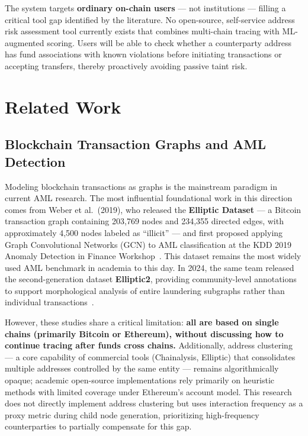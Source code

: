 \documentclass[12pt,a4paper]{article}
\begin{document}
The system targets \textbf{ordinary on-chain users} --- not institutions --- filling a critical tool gap identified by the literature. No open-source, self-service address risk assessment tool currently exists that combines multi-chain tracing with ML-augmented scoring. Users will be able to check whether a counterparty address has fund associations with known violations before initiating transactions or accepting transfers, thereby proactively avoiding passive taint risk.


\section{Related Work}

\subsection{Blockchain Transaction Graphs and AML Detection}

Modeling blockchain transactions as graphs is the mainstream paradigm in current AML research. The most influential foundational work in this direction comes from Weber et al.~(2019), who released the \textbf{Elliptic Dataset} --- a Bitcoin transaction graph containing 203,769 nodes and 234,355 directed edges, with approximately 4,500 nodes labeled as ``illicit'' --- and first proposed applying Graph Convolutional Networks (GCN) to AML classification at the KDD 2019 Anomaly Detection in Finance Workshop~\cite{weber2019}. This dataset remains the most widely used AML benchmark in academia to this day. In 2024, the same team released the second-generation dataset \textbf{Elliptic2}, providing community-level annotations to support morphological analysis of entire laundering subgraphs rather than individual transactions~\cite{bellei2024}.

However, these studies share a critical limitation: \textbf{all are based on single chains (primarily Bitcoin or Ethereum), without discussing how to continue tracing after funds cross chains.} Additionally, address clustering --- a core capability of commercial tools (Chainalysis, Elliptic) that consolidates multiple addresses controlled by the same entity --- remains algorithmically opaque; academic open-source implementations rely primarily on heuristic methods with limited coverage under Ethereum's account model. This research does not directly implement address clustering but uses interaction frequency as a proxy metric during child node generation, prioritizing high-frequency counterparties to partially compensate for this gap.
\end{document}
